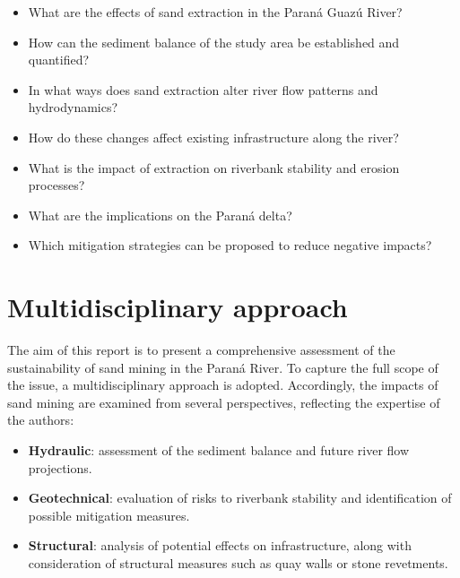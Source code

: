 \begin{itemize} 
    \item What are the effects of sand extraction in the Paraná Guazú River?
    \item How can the sediment balance of the study area be established and quantified?
    \item In what ways does sand extraction alter river flow patterns and hydrodynamics?
    \item How do these changes affect existing infrastructure along the river?
    \item What is the impact of extraction on riverbank stability and erosion processes?
    \item What are the implications on the Paraná delta?
    \item Which mitigation strategies can be proposed to reduce negative impacts?
\end{itemize}

\section{Multidisciplinary approach}
The aim of this report is to present a comprehensive assessment of the sustainability of sand mining in the Paraná River. To capture the full scope of the issue, a multidisciplinary approach is adopted. Accordingly, the impacts of sand mining are examined from several perspectives, reflecting the expertise of the authors:

\begin{itemize}
    \item \textbf{Hydraulic}: assessment of the sediment balance and future river flow projections.
    \item \textbf{Geotechnical}: evaluation of risks to riverbank stability and identification of possible mitigation measures.
    \item \textbf{Structural}: analysis of potential effects on infrastructure, along with consideration of structural measures such as quay walls or stone revetments.
\end{itemize}

